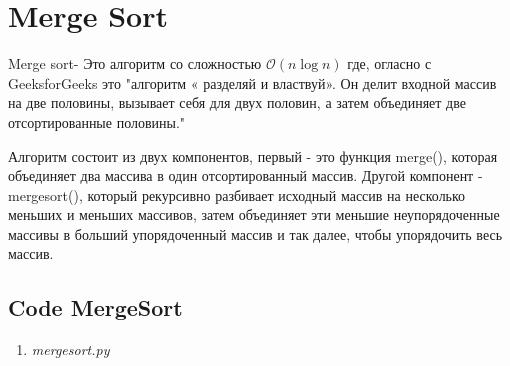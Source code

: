 
\section{Merge Sort}

Merge sort- Это алгоритм со сложностью \(\mathcal{O}(n\log{}n)\) где,
огласно с GeeksforGeeks это \cite{geek} "алгоритм « разделяй и властвуй». Он
делит входной массив на две половины, вызывает себя для двух половин,
а затем объединяет две отсортированные половины."

Алгоритм состоит из двух компонентов, первый - это функция merge(),
которая объединяет два массива в один отсортированный массив. Другой компонент
- mergesort(), который рекурсивно разбивает исходный массив на несколько
меньших и меньших массивов, затем объединяет эти меньшие неупорядоченные
массивы в больший упорядоченный массив и так далее, чтобы упорядочить
весь массив.


\subsection{Code MergeSort}
\singlespace

\begin{enumerate}
  \item \textit{mergesort.py}

  

\end{enumerate}

